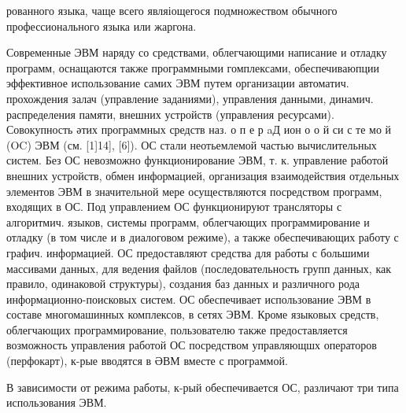 \documentclass[10pt]{article}
\begin{document}
рованного языка, чаще всего являіощегося подмножеством обычного профессионального языка или жаргона.



Современные ЭВМ наряду со средствами, облегчающими написание и отладку программ, оснащаются также программными гомплексами, обеспечиваюпции эффективное использование самих ЭВМ путем организации автоматич. прохождения залач (управление заданиями), управления данными, динамич. распределения памяти, внешних устройств (управления ресурсами). Совокупность әтих программных средств наз. о п е р aД ион о о й си с те мо й (OC) ЭВМ (см. [1]14], [6]). ОС стали неотьемлемой частью вычислительных систем. Без ОС невозможно функционирование ЭВМ, т. к. управление работой внешних устройств, обмен информацией, организация взаимодействия отдельных элементов ЭВМ в значительной мере осуществляются посредством программ, входящих в ОС. Под управлением ОС функционируют трансляторы с алгоритмич. языков, системы программ, облегчающих программирование и отладку (в том числе и в диалоговом режиме), а также обеспечивающих работу с графич. информацией. ОС предоставляют средства для работы с большими массивами данных, для ведения файлов (последовательность групп данных, как правило, одинаковой структуры), создания баз данных и различного рода информационно-поисковых систем. ОС обеспечивает использование ЭВМ в составе многомашинных комплексов, в сетях ЭВМ. Кроме языковых средств, облегчающих программирование, пользователю также предоставляется возможность управления работой ОС посредством управляющшх операторов (перфокарт), к-рые вводятся в ӘВМ вместе с программой.



В зависимости от режима работы, к-рый обеспечивается ОС, различают три типа использования ЭВМ.
\end{document}
